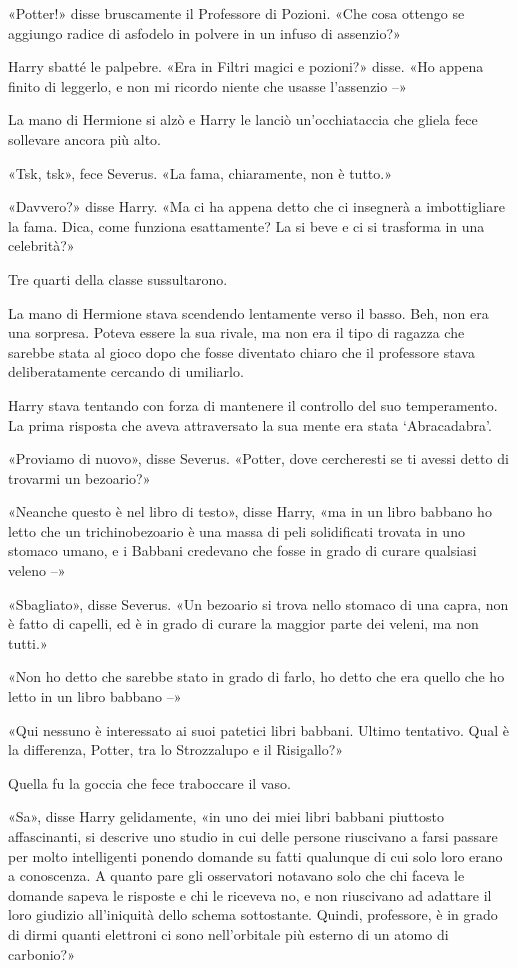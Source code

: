 «Potter!» disse bruscamente il Professore di Pozioni. «Che cosa ottengo se aggiungo radice di asfodelo in polvere in un infuso di assenzio?»

Harry sbatté le palpebre. «Era in Filtri magici e pozioni?» disse. «Ho appena finito di leggerlo, e non mi ricordo niente che usasse l’assenzio –»

La mano di Hermione si alzò e Harry le lanciò un’occhiataccia che gliela fece sollevare ancora più alto.

«Tsk, tsk», fece Severus. «La fama, chiaramente, non è tutto.»

«Davvero?» disse Harry. «Ma ci ha appena detto che ci insegnerà a imbottigliare la fama. Dica, come funziona esattamente? La si beve e ci si trasforma in una celebrità?»

Tre quarti della classe sussultarono.

La mano di Hermione stava scendendo lentamente verso il basso. Beh, non era una sorpresa. Poteva essere la sua rivale, ma non era il tipo di ragazza che sarebbe stata al gioco dopo che fosse diventato chiaro che il professore stava deliberatamente cercando di umiliarlo.

Harry stava tentando con forza di mantenere il controllo del suo temperamento. La prima risposta che aveva attraversato la sua mente era stata ‘Abracadabra’.

«Proviamo di nuovo», disse Severus. «Potter, dove cercheresti se ti avessi detto di trovarmi un bezoario?»

«Neanche questo è nel libro di testo», disse Harry, «ma in un libro babbano ho letto che un trichinobezoario è una massa di peli solidificati trovata in uno stomaco umano, e i Babbani credevano che fosse in grado di curare qualsiasi veleno –»

«Sbagliato», disse Severus. «Un bezoario si trova nello stomaco di una capra, non è fatto di capelli, ed è in grado di curare la maggior parte dei veleni, ma non tutti.»

«Non ho detto che sarebbe stato in grado di farlo, ho detto che era quello che ho letto in un libro babbano –»

«Qui nessuno è interessato ai suoi patetici libri babbani. Ultimo tentativo. Qual è la differenza, Potter, tra lo Strozzalupo e il Risigallo?»

Quella fu la goccia che fece traboccare il vaso.

«Sa», disse Harry gelidamente, «in uno dei miei libri babbani piuttosto affascinanti, si descrive uno studio in cui delle persone riuscivano a farsi passare per molto intelligenti ponendo domande su fatti qualunque di cui solo loro erano a conoscenza. A quanto pare gli osservatori notavano solo che chi faceva le domande sapeva le risposte e chi le riceveva no, e non riuscivano ad adattare il loro giudizio all’iniquità dello schema sottostante. Quindi, professore, è in grado di dirmi quanti elettroni ci sono nell’orbitale più esterno di un atomo di carbonio?»

